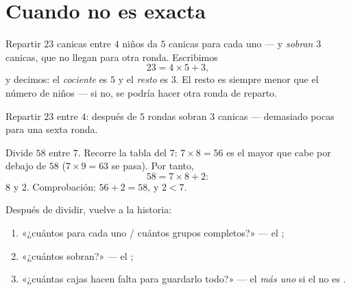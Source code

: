 \section{Cuando no es exacta}

\begin{definition}[El resto]\label{def:g3:division:remainder}
Repartir $23$ canicas entre $4$ niños da $5$ canicas para cada uno ---
y \emph{sobran} $3$ canicas, que no llegan para otra ronda. Escribimos
\[
23 = 4 \times 5 + 3 ,
\]
y decimos: el \emph{cociente} es $5$ y el
\emph{resto} es $3$. El resto es siempre
menor que el número de niños --- si no, se podría hacer otra ronda
de reparto.
\end{definition}

\begin{omfigure}

{\small Repartir $23$ entre $4$: después de $5$ rondas sobran $3$ canicas
--- demasiado pocas para una sexta ronda.}
\end{omfigure}

\begin{example}\label{ex:g3:division:remainder}
Divide $58$ entre $7$. Recorre la tabla del $7$:
$7 \times 8 = 56$ es el mayor  que cabe por debajo de $58$
($7 \times 9 = 63$ se pasa). Por tanto,
\[
58 = 7 \times 8 + 2 :
\]
 $8$ y  $2$. Comprobación: $56 + 2 = 58$, y $2 < 7$.
\end{example}

\begin{method}\label{met:g3:division:interpret}
Después de dividir, vuelve a la historia:
\begin{enumerate}
  \item «¿cuántos para cada uno / cuántos grupos completos?» --- el ;
  \item «¿cuántos sobran?» --- el ;
  \item «¿cuántas cajas hacen falta para guardarlo todo?» --- el 
        \emph{más uno} si el  no es .
\end{enumerate}
\end{method}

